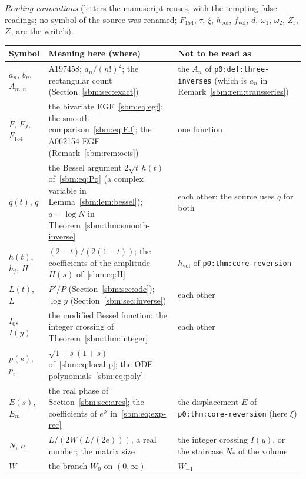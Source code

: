 \documentclass[11pt,letterpaper]{article}
\numberwithin{equation}{section}
\theoremstyle{remark}\newtheorem{remark}[theorem]{Remark}
\newcommand{\file}[1]{\nolinkurl{#1}}
\begin{document}
\medskip\noindent\begin{minipage}{\textwidth}
\emph{Reading conventions} (letters the manuscript reuses, with the tempting
false readings; no symbol of the source was renamed; $F_{154}$, $\tau$,
$\xi$, $h_{\mathrm{vol}}$, $f_{\mathrm{vol}}$, $d$, $\omega_1$, $\omega_2$,
$Z_{\mathrm r}$, $Z_{\mathrm c}$ are the write's).\par
\smallskip
\begingroup\small\renewcommand{\arraystretch}{1.1}
\noindent\begin{tabular}{@{}>{\raggedright\arraybackslash}p{0.95in}>{\raggedright\arraybackslash}p{3.0in}>{\raggedright\arraybackslash}p{2.15in}@{}}
\toprule
Symbol & Meaning here (where) & Not to be read as\\
\midrule
$a_n$, $b_n$, $A_{m,n}$ & A197458; $a_n/(n!)^2$; the rectangular count (Section~\ref{sbm:sec:exact}) & the $A_n$ of \file{p0:def:three-inverses} (which is $a_n$ in Remark~\ref{sbm:rem:transseries})\\
$F$, $F_J$, $F_{154}$ & the bivariate EGF~\eqref{sbm:eq:egf}; the smooth comparison~\eqref{sbm:eq:FJ}; the A062154 EGF (Remark~\ref{sbm:rem:oeis}) & one function\\
$q(t)$, $q$ & the Bessel argument $2\sqrt t\,h(t)$ of~\eqref{sbm:eq:Pq} (a complex variable in Lemma~\ref{sbm:lem:bessel}); $q=\log N$ in Theorem~\ref{sbm:thm:smooth-inverse} & each other: the source uses $q$ for both\\
$h(t)$, $h_j$, $H$ & $(2-t)/(2(1-t))$; the coefficients of the amplitude $H(s)$ of~\eqref{sbm:eq:H} & $h_{\mathrm{vol}}$ of \file{p0:thm:core-reversion}\\
$L(t)$, $L$ & $P'/P$ (Section~\ref{sbm:sec:ode}); $\log y$ (Section~\ref{sbm:sec:inverse}) & each other\\
$I_0$, $I(y)$ & the modified Bessel function; the integer crossing of Theorem~\ref{sbm:thm:integer} & each other\\
$p(s)$, $p_i$ & $\sqrt{1-s}(1+s)$ of~\eqref{sbm:eq:local-p}; the ODE polynomials~\eqref{sbm:eq:poly} & \\
$E(s)$, $E_m$ & the real phase of Section~\ref{sbm:sec:arcs}; the coefficients of $e^\Psi$ in~\eqref{sbm:eq:exp-rec} & the displacement $E$ of \file{p0:thm:core-reversion} (here $\xi$)\\
$N$, $n$ & $L/(2W(L/(2e)))$, a real number; the matrix size & the integer crossing $I(y)$, or the staircase $N_\ast$ of the volume\\
$W$ & the branch $W_0$ on $(0,\infty)$ & $W_{-1}$\\

\end{tabular}
\end{minipage}
\end{document}
